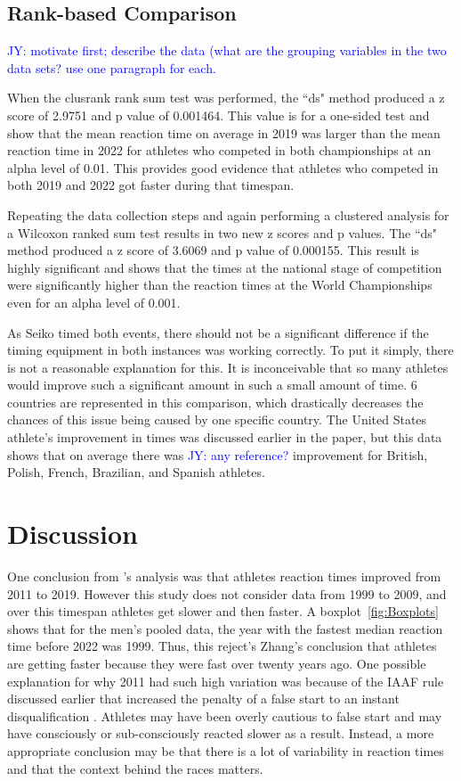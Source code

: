 \documentclass[12pt, letterpaper, titlepage]{article}
\newcommand{\jy}[1]{\textcolor{blue}{JY: #1}}
\begin{document}
\subsection{Rank-based Comparison} \label{subsec:Results_Rank}


\jy{motivate first; describe the data (what are the grouping variables in the
  two data sets? use one paragraph for each.}


When the clusrank rank sum test was performed, the ``ds" method produced a z score of
2.9751 and p value of 0.001464.  This value is for a one-sided test and show that
the mean reaction time on average in 2019 was larger than the mean reaction time
in 2022 for athletes who competed in both championships at an alpha level of 0.01.
This provides good evidence that athletes who competed in both 2019 and 2022 got
faster during that timespan.


Repeating the data collection steps and
again performing a clustered analysis for a Wilcoxon ranked sum test
results in two new z scores and p values.  The ``ds" method produced a z score of
3.6069 and p value of 0.000155.  This result is highly significant and shows that
the times at the national stage of competition were significantly higher than
the reaction times at the World Championships even for an alpha level of 0.001.

As Seiko timed both events, there should not be a significant
difference if the timing equipment in both instances was working correctly.
  To put it simply, there is not a reasonable explanation for 
this. It is inconceivable that so many athletes would improve such a significant
amount in such a small amount of time. 6 countries are represented in this 
comparison, which drastically decreases the chances of this issue being caused by
one specific country.  The United States athlete's improvement in times was
discussed earlier in the paper, but this data shows that on average there was
\jy{any reference?}
improvement for British, Polish, French, Brazilian, and Spanish athletes.


\section{Discussion}\label{sec:Discussion}

One conclusion from \citet{zhang2021correlation}'s analysis was that athletes
reaction times improved from 2011 to 2019.  However this study does not consider 
data from 1999 to 2009, and over this timespan athletes get slower and then
faster.  A boxplot~\ref{fig:Boxplots} shows that for the men's pooled data, the 
year with the fastest median reaction time before 2022 was 1999.  Thus, this 
reject's Zhang's conclusion that athletes are getting faster because they were 
fast over twenty years ago. One possible explanation for why 2011 had such
high variation was because of the IAAF rule discussed earlier that increased the
penalty of a false start to an instant disqualification \citep{iaaf2009falsestart}.
Athletes may have been overly cautious to false start and may have consciously
or sub-consciously reacted slower as a result.  Instead, a more appropriate 
conclusion may be that there is a lot of variability in reaction times and that
the context behind the races matters.
\end{document}
